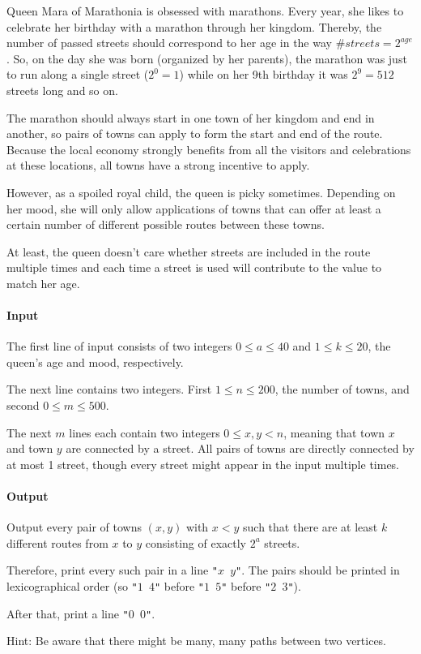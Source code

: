 




Queen Mara of Marathonia is obsessed with marathons. Every year, she likes to celebrate her birthday with a marathon through her kingdom. Thereby, the number of passed streets should correspond to her age in the way \(\#streets = 2^{age}\). So, on the day she was born (organized by her parents), the marathon was just to run along a single street (\(2^0=1\)) while on her 9th birthday it was \(2^9=512\) streets long and so on.

The marathon should always start in one town of her kingdom and end in another, so pairs of towns can apply to form the start and end of the route. Because the local economy strongly benefits from all the visitors and celebrations at these locations, all towns have a strong incentive to apply.

However, as a spoiled royal child, the queen is picky sometimes. Depending on her mood, she will only allow applications of towns that can offer at least a certain number of different possible routes between these towns.

At least, the queen doesn't care whether streets are included in the route multiple times and each time a street is used will contribute to the value to match her age.

\paragraph*{Input}

The first line of input consists of two integers \(0\le a \le 40\) and \(1\le k \le 20\), the queen's age and mood, respectively.

The next line contains two integers. First \(1 \le n \le 200\), the number of towns, and second \(0\le m \le 500\). 

The next \(m\) lines each contain two integers \(0 \le x,y < n\), meaning that town \(x\) and town \(y\) are connected by a street. All pairs of towns are directly connected by at most 1 street, though every street might appear in the input multiple times.

\paragraph*{Output}
Output every pair of towns \((x,y)\) with \(x < y\) such that there are at least \(k\) different routes from \(x\) to \(y\) consisting of exactly \(2^a\) streets.

Therefore, print every such pair in a line \texttt{"\(x\) \(y\)"}. The pairs should be printed in lexicographical order (so \texttt{"\(1\) \(4\)"} before \texttt{"\(1\) \(5\)"} before \texttt{"\(2\) \(3\)"}).

After that, print a line \texttt{"\(0\) \(0\)"}.

Hint: Be aware that there might be many, many paths between two vertices.

\begin{samples}
\end{samples}


